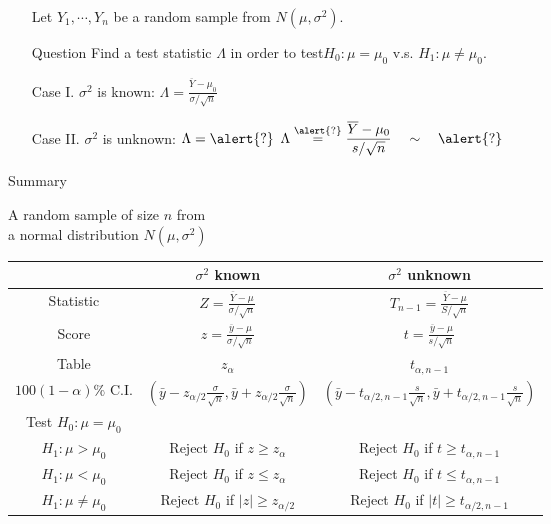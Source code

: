 \begin{frame}
\begin{enumerate}
	\item[] Let $Y_1,\cdots,Y_n$ be a random sample from $N(\mu,\sigma^2)$.\\[1em]
	\item[Question] Find a test statistic $\Lambda$ in order to test\qquad $H_0 : \mu = \mu_0$ v.s. $H_1 : \mu \ne \mu_0$.
\vfill
\item[Case I.] $\sigma^2$ is known: \hspace{4em}
	$\displaystyle	\Lambda =  \frac{\overline{Y}-\mu_0}{\sigma/\sqrt{n}}$
\vfill
\item[Case II.] $\sigma^2$ is unknown: \hspace{3em} $\displaystyle \Lambda = \alert{?}$
	\pause \hspace{3em}
	$\displaystyle	\Lambda \stackrel{\alert{?}}{=}  \frac{\overline{Y}-\mu_0}{s/\sqrt{n}}\quad \sim\quad \alert{?}$
\end{enumerate}
\end{frame}
\begin{frame}{Summary}
\begin{center}
A random sample of size $n$ from \\
a normal distribution $N(\mu,\sigma^2)$\\[2em]
\def\arraystretch{2}
\small
\begin{tabular}{c|c|c}
& $\sigma^2$ known & $\sigma^2$ unknown \\
\hline\hline
Statistic &
$Z = \frac{\overline{Y}-\mu}{\sigma/\sqrt{n}}$ &
$T_{n-1} = \frac{\overline{Y}-\mu}{S/\sqrt{n}}$\\
\hline
Score &
$z = \frac{\overline{y}-\mu}{\sigma/\sqrt{n}}$ &
$t = \frac{\overline{y}-\mu}{s/\sqrt{n}}$\\
\hline
Table & $z_{\alpha}$ & $t_{\alpha,n-1}$ \\
\hline
$100(1-\alpha)\%$ C.I. &
$\left( \bar{y}-z_{\alpha/2}\frac{\sigma}{\sqrt{n}}, \bar{y}+z_{\alpha/2}\frac{\sigma}{\sqrt{n}}\right)$ &
$\left( \bar{y}-t_{\alpha/2,n-1}\frac{s}{\sqrt{n}}, \bar{y}+t_{\alpha/2,n-1}\frac{s}{\sqrt{n}}\right)$ \\
\hline
Test $H_0:\mu=\mu_0$ &
&
\\
$H_1:\mu>\mu_0$ &   Reject $H_0$ if $z\ge z_{\alpha}$
&   Reject $H_0$ if $t\ge t_{\alpha,n-1}$
\\
$H_1:\mu<\mu_0$ &  Reject $H_0$ if $z\le z_{\alpha}$
&  Reject $H_0$ if $t\le t_{\alpha,n-1}$
\\
$H_1:\mu\ne\mu_0$ &  Reject $H_0$ if $|z|\ge z_{\alpha/2}$
&    Reject $H_0$ if $|t|\ge t_{\alpha/2,n-1}$
\\
\hline
\end{tabular}
\end{center}
\end{frame}
